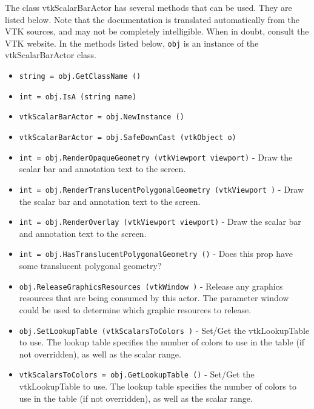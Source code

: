 The class vtkScalarBarActor has several methods that can be used.
  They are listed below.
Note that the documentation is translated automatically from the VTK sources,
and may not be completely intelligible.  When in doubt, consult the VTK website.
In the methods listed below, \verb|obj| is an instance of the vtkScalarBarActor class.
\begin{itemize}
\item  \verb|string = obj.GetClassName ()|

\item  \verb|int = obj.IsA (string name)|

\item  \verb|vtkScalarBarActor = obj.NewInstance ()|

\item  \verb|vtkScalarBarActor = obj.SafeDownCast (vtkObject o)|

\item  \verb|int = obj.RenderOpaqueGeometry (vtkViewport viewport)| -  Draw the scalar bar and annotation text to the screen.

\item  \verb|int = obj.RenderTranslucentPolygonalGeometry (vtkViewport )| -  Draw the scalar bar and annotation text to the screen.

\item  \verb|int = obj.RenderOverlay (vtkViewport viewport)| -  Draw the scalar bar and annotation text to the screen.

\item  \verb|int = obj.HasTranslucentPolygonalGeometry ()| -  Does this prop have some translucent polygonal geometry?

\item  \verb|obj.ReleaseGraphicsResources (vtkWindow )| -  Release any graphics resources that are being consumed by this actor.
 The parameter window could be used to determine which graphic
 resources to release.

\item  \verb|obj.SetLookupTable (vtkScalarsToColors )| -  Set/Get the vtkLookupTable to use. The lookup table specifies the number
 of colors to use in the table (if not overridden), as well as the scalar
 range.

\item  \verb|vtkScalarsToColors = obj.GetLookupTable ()| -  Set/Get the vtkLookupTable to use. The lookup table specifies the number
 of colors to use in the table (if not overridden), as well as the scalar
 range.


\end{itemize}

